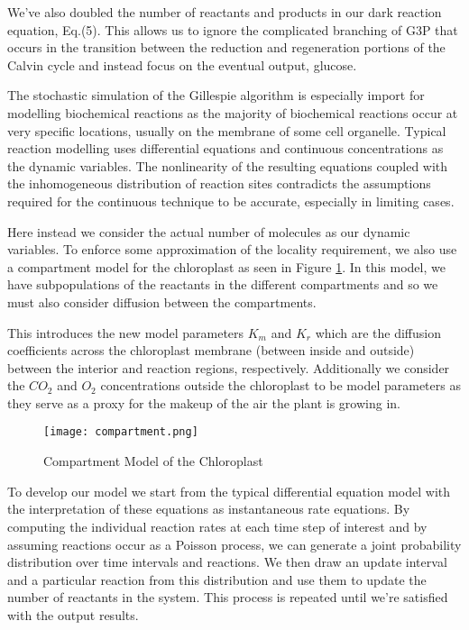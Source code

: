 \documentclass[12pt,reqno]{amsart}
\begin{document}
	We've also doubled the number of reactants and products in our dark
	reaction equation, Eq.(5).  This allows us to ignore the complicated 
	branching of G3P that occurs in the transition between the reduction 
	and regeneration portions of the Calvin cycle and instead focus on 
	the eventual output, glucose.  
	
	The stochastic simulation of the Gillespie algorithm is especially 
	import for modelling biochemical reactions as the majority of biochemical 
	reactions occur at very specific locations, usually on the membrane of 
	some cell organelle.  Typical reaction modelling uses differential equations
	and continuous concentrations as the dynamic variables. The nonlinearity
	of the resulting equations coupled with the inhomogeneous distribution of 
	reaction sites contradicts the assumptions required for the continuous 
	technique to be accurate, especially in limiting cases\cite{gillespie}.
	
	Here instead we consider the actual number of molecules as our dynamic
	variables. To enforce some approximation of the locality requirement,
	we also use a compartment model for the chloroplast as seen in Figure 
	\ref{compartment}. In this model, we have subpopulations of the reactants
	in the different compartments and so we must also consider diffusion
	between the compartments. 
	
	This introduces the new model parameters $K_m$
	and $K_r$ which are the diffusion coefficients across the chloroplast 
	membrane (between inside and outside) between the interior and reaction
	regions, respectively.  Additionally we consider the $CO_2$ and $O_2$
	concentrations outside the chloroplast to be model parameters as they
	serve as a proxy for the makeup of the air the plant is growing in. 	
	
	\begin{figure}[h]
        \caption{Compartment Model of the Chloroplast}
        \centering
        \texttt{[image: compartment.png]}
    \label{compartment}
    \end{figure}
    
    To develop our model we start from the typical differential equation
    model with the interpretation of these equations as instantaneous 
    rate equations. By computing the individual reaction rates at each 
    time step of interest and by assuming reactions occur as a Poisson
    process, we can generate a joint probability distribution over
    time intervals and reactions. We then draw an update interval and a
    particular reaction from this distribution and use them to update
    the number of reactants in the system. This process is repeated
    until we're satisfied with the output results.
    
\end{document}

